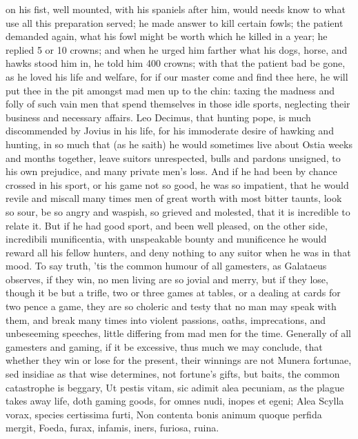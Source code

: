 {on his fist, well mounted, with his spaniels after him, would needs
know to what use all this preparation served; he made answer to kill
certain fowls; the patient demanded again, what his fowl might be worth
which he killed in a year; he replied 5 or 10 crowns; and when he urged
him farther what his dogs, horse, and hawks stood him in, he told him
400 crowns; with that the patient bad be gone, as he loved his life and
welfare, for if our master come and find thee here, he will put thee in
the pit amongst mad men up to the chin: taxing the madness and folly of
such vain men that spend themselves in those idle sports, neglecting
their business and necessary affairs. Leo Decimus, that hunting pope,
is much discommended by Jovius in his life, for his immoderate
desire of hawking and hunting, in so much that (as he saith) he would
sometimes live about Ostia weeks and months together, leave suitors
unrespected, bulls and pardons unsigned, to his own prejudice,
and many private men's loss. And if he had been by chance crossed
in his sport, or his game not so good, he was so impatient, that he
would revile and miscall many times men of great worth with most bitter
taunts, look so sour, be so angry and waspish, so grieved and molested,
that it is incredible to relate it. But if he had good sport, and been
well pleased, on the other side, incredibili munificentia, with
unspeakable bounty and munificence he would reward all his fellow
hunters, and deny nothing to any suitor when he was in that mood. To
say truth, 'tis the common humour of all gamesters, as Galataeus
observes, if they win, no men living are so jovial and merry, but
if they lose, though it be but a trifle, two or three games at
tables, or a dealing at cards for two pence a game, they are so
choleric and testy that no man may speak with them, and break many
times into violent passions, oaths, imprecations, and unbeseeming
speeches, little differing from mad men for the time. Generally of all
gamesters and gaming, if it be excessive, thus much we may conclude,
that whether they win or lose for the present, their winnings are not
Munera fortunae, sed insidiae as that wise \Seneca determines, not
fortune's gifts, but baits, the common catastrophe is beggary,
Ut pestis vitam, sic adimit alea pecuniam, as the plague takes
away life, doth gaming goods, for  omnes nudi, inopes et egeni;
Alea Scylla vorax, species certissima furti,
Non contenta bonis animum quoque perfida mergit,
Foeda, furax, infamis, iners, furiosa, ruina.

}
